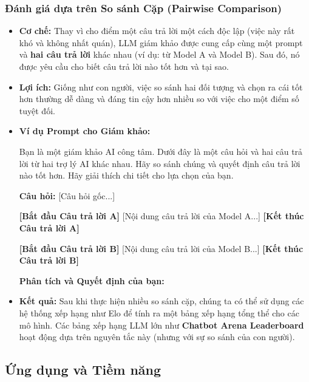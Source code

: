 \subsubsection{Đánh giá dựa trên So sánh Cặp (Pairwise Comparison)}
\begin{itemize}
    \item \textbf{Cơ chế:} Thay vì cho điểm một câu trả lời một cách độc lập (việc này rất khó và không nhất quán), LLM giám khảo được cung cấp cùng một prompt và \textbf{hai câu trả lời} khác nhau (ví dụ: từ Model A và Model B). Sau đó, nó được yêu cầu cho biết câu trả lời nào tốt hơn và tại sao.
    \item \textbf{Lợi ích:} Giống như con người, việc so sánh hai đối tượng và chọn ra cái tốt hơn thường dễ dàng và đáng tin cậy hơn nhiều so với việc cho một điểm số tuyệt đối.
    \item \textbf{Ví dụ Prompt cho Giám khảo:}
        \begin{tcolorbox}[colback=gray!5!white, colframe=gray!50!black, sharp corners]
        Bạn là một giám khảo AI công tâm. Dưới đây là một câu hỏi và hai câu trả lời từ hai trợ lý AI khác nhau. Hãy so sánh chúng và quyết định câu trả lời nào tốt hơn. Hãy giải thích chi tiết cho lựa chọn của bạn.

        \textbf{Câu hỏi:} [Câu hỏi gốc...]
        
        \textbf{[Bắt đầu Câu trả lời A]}
        [Nội dung câu trả lời của Model A...]
        \textbf{[Kết thúc Câu trả lời A]}

        \textbf{[Bắt đầu Câu trả lời B]}
        [Nội dung câu trả lời của Model B...]
        \textbf{[Kết thúc Câu trả lời B]}
        
        \textbf{Phân tích và Quyết định của bạn:}
        \end{tcolorbox}
    \item \textbf{Kết quả:} Sau khi thực hiện nhiều so sánh cặp, chúng ta có thể sử dụng các hệ thống xếp hạng như Elo để tính ra một bảng xếp hạng tổng thể cho các mô hình. Các bảng xếp hạng LLM lớn như \textbf{Chatbot Arena Leaderboard} hoạt động dựa trên nguyên tắc này (nhưng với sự so sánh của con người).
\end{itemize}

\subsection{Ứng dụng và Tiềm năng}
\label{ssec:llm_judge_applications}

